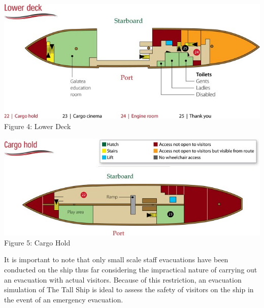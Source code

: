 \begin{center}
\includegraphics[scale=0.4]{../images/lowerdeck.jpg}
\\Figure 4: Lower Deck
\end{center}

\begin{center}
\includegraphics[scale=0.4]{../images/cargohold.jpg}
\\Figure 5: Cargo Hold
\end{center}

It is important to note that only small scale staff evacuations have been conducted on the ship
thus far considering the impractical nature of carrying out an evacuation with
actual visitors. Because of this restriction, an evacuation simulation of The
Tall Ship is ideal to assess the safety of visitors on the ship in the event of an
emergency evacuation.

%

%
